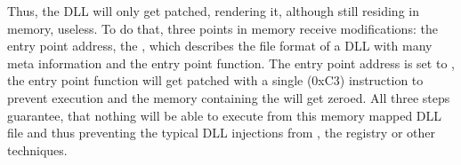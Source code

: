 Thus, the \gls{DLL} will only get patched, rendering it, although still residing in memory, useless. To do that, three points in memory receive modifications: the entry point address, the , which describes the file format of a \gls{DLL} with many meta information and the entry point function. The entry point address is set to , the entry point function will get patched with a single  (0xC3) instruction to prevent execution and the memory containing the  will get zeroed. All three steps guarantee, that nothing will be able to execute from this memory mapped \gls{DLL} file and thus preventing the typical \gls{DLL} injections from , the registry or other techniques.